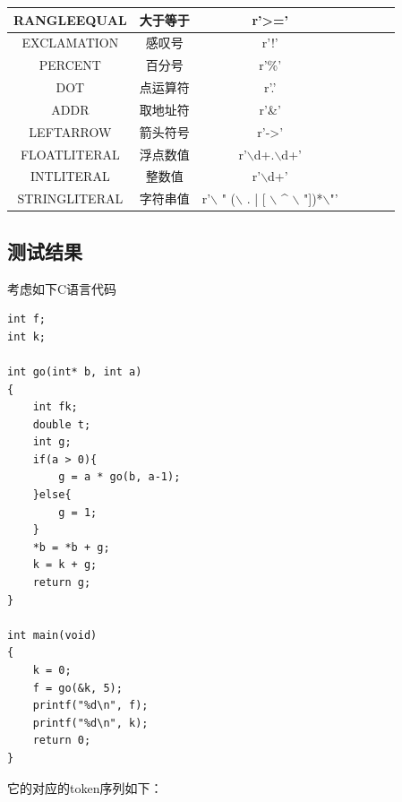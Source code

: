\documentclass{article}
\begin{document}
\begin{table}[H]
\begin{tabular}{|c|c|c|c|c|c|c|}
		RANGLEEQUAL     & 大于等于  &   r'>='  \\\hline
		EXCLAMATION     & 感叹号  &   r'!'  \\\hline
		PERCENT 	 	& 	百分号	  & r'\%'    \\\hline
		DOT     & 点运算符  &  r'.'    \\\hline
		ADDR 	 	& 取地址符		  & r'\&'    \\\hline
		LEFTARROW     & 箭头符号  &  r'->'    \\\hline
		FLOATLITERAL 	 	& 浮点数值		  & r'$\backslash$d+.$\backslash$d+'    \\\hline
		INTLITERAL     & 整数值  &  r'$\backslash$d+'    \\\hline
		STRINGLITERAL 	 	& 字符串值		  & r'$\backslash$ " ($\backslash$ . | [ $\backslash$ \^ $\backslash$ "])*$\backslash$"'   \\\hline
	\end{tabular}
\end{table}


\subsection{测试结果}

考虑如下C语言代码

\begin{verbatim}
int f;
int k;

int go(int* b, int a)
{
    int fk;
    double t;
    int g;
    if(a > 0){
        g = a * go(b, a-1);
    }else{
        g = 1;
    }
    *b = *b + g;
    k = k + g;
    return g;
}

int main(void)
{
    k = 0;
    f = go(&k, 5);
    printf("%d\n", f);
    printf("%d\n", k);
    return 0;
}
\end{verbatim}

它的对应的token序列如下：
\end{document}
